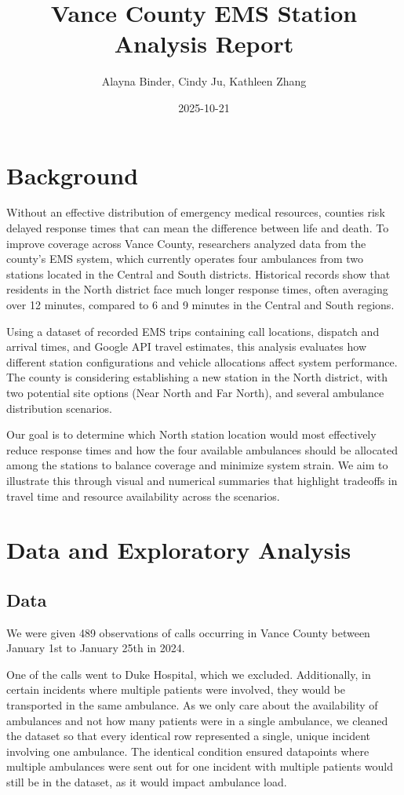 \documentclass[
]{article}
\title{Vance County EMS Station Analysis Report}
\author{Alayna Binder, Cindy Ju, Kathleen Zhang}
\date{2025-10-21}
\begin{document}
\maketitle

\section{Background}\label{background}

Without an effective distribution of emergency medical resources,
counties risk delayed response times that can mean the difference
between life and death. To improve coverage across Vance County,
researchers analyzed data from the county's EMS system, which currently
operates four ambulances from two stations located in the Central and
South districts. Historical records show that residents in the North
district face much longer response times, often averaging over 12
minutes, compared to 6 and 9 minutes in the Central and South regions.

Using a dataset of recorded EMS trips containing call locations,
dispatch and arrival times, and Google API travel estimates, this
analysis evaluates how different station configurations and vehicle
allocations affect system performance. The county is considering
establishing a new station in the North district, with two potential
site options (Near North and Far North), and several ambulance
distribution scenarios.

Our goal is to determine which North station location would most
effectively reduce response times and how the four available ambulances
should be allocated among the stations to balance coverage and minimize
system strain. We aim to illustrate this through visual and numerical
summaries that highlight tradeoffs in travel time and resource
availability across the scenarios.

\section{Data and Exploratory
Analysis}\label{data-and-exploratory-analysis}

\subsection{Data}\label{data}

We were given 489 observations of calls occurring in Vance County
between January 1st to January 25th in 2024.

One of the calls went to Duke Hospital, which we excluded. Additionally,
in certain incidents where multiple patients were involved, they would
be transported in the same ambulance. As we only care about the
availability of ambulances and not how many patients were in a single
ambulance, we cleaned the dataset so that every identical row
represented a single, unique incident involving one ambulance. The
identical condition ensured datapoints where multiple ambulances were
sent out for one incident with multiple patients would still be in the
dataset, as it would impact ambulance load.
\end{document}
